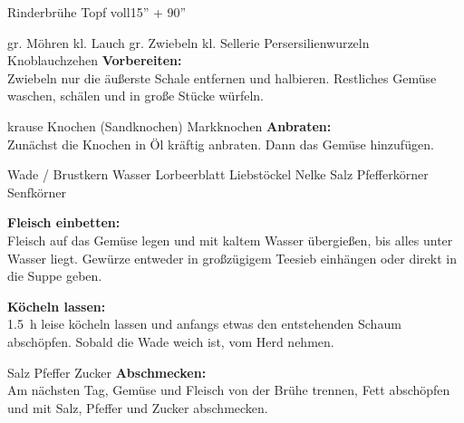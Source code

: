 \begin{MyRecipe}{Rinderbrühe}{ Topf voll}{15'' + 90''}

\ingredient[\Calc{2}{\x}]{} {gr. Möhren}
\ingredient[\Calc{1}{\x}]{} {kl. Lauch}
\ingredient[\Calc{2}{\x}]{} {gr. Zwiebeln}
\ingredient[\Calc{1}{\x}]{} {kl. Sellerie}
\ingredient[\Calc{2}{\x}]{} {Persersilienwurzeln}
\ingredient[\Calc{2}{\x}]{} {Knoblauchzehen}
\textbf{Vorbereiten:}\\
Zwiebeln nur die äußerste Schale entfernen und halbieren. Restliches Gemüse waschen, schälen und in große Stücke würfeln.

 {krause Knochen (Sandknochen)}
 {Markknochen}
\textbf{Anbraten:}\\
Zunächst die Knochen in Öl kräftig anbraten. Dann das Gemüse hinzufügen.

 {Wade / Brustkern}
 {Wasser}
\ingredient[\Calc{1}{\x}]{} {Lorbeerblatt}
 {Liebstöckel}
\ingredient[\Calc{1}{\x}]{} {Nelke}
 {Salz}
 {Pfefferkörner}
 {Senfkörner}

\textbf{Fleisch einbetten:}\\
Fleisch auf das Gemüse legen und mit kaltem Wasser übergießen, bis alles unter Wasser liegt. Gewürze entweder in großzügigem Teesieb einhängen oder direkt in die Suppe geben.

\textbf{Köcheln lassen:}\\
\SI{1,5}{\hour} leise köcheln lassen und anfangs etwas den entstehenden Schaum abschöpfen. Sobald die Wade weich ist, vom Herd nehmen.\par

\ingredient[]{} {Salz}
\ingredient[]{} {Pfeffer}
\ingredient[]{} {Zucker}
\textbf{Abschmecken:}\\
Am nächsten Tag, Gemüse und Fleisch von der Brühe trennen, Fett abschöpfen und mit Salz, Pfeffer und Zucker abschmecken.









\end{MyRecipe}